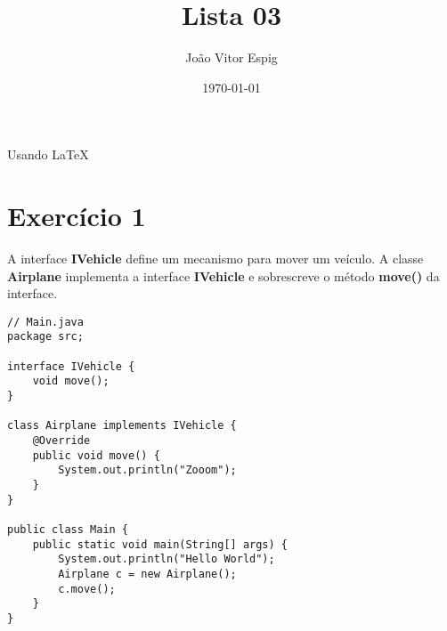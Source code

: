 \documentclass[12pt,a4paper,brazil]{article}
\title{Lista 03}
\author{João Vitor Espig}
\date{\today}
\begin{document}
\maketitle
Usando \LaTeX

\section*{Exercício 1}
A interface \textbf{IVehicle} define um mecanismo para mover um veículo. A classe \textbf{Airplane} implementa a interface \textbf{IVehicle} e sobrescreve o método \textbf{move()} da interface.
\begin{lstlisting}
// Main.java
package src;

interface IVehicle {
    void move();
}

class Airplane implements IVehicle {
    @Override
    public void move() {
        System.out.println("Zooom");
    }
}

public class Main {
    public static void main(String[] args) {
        System.out.println("Hello World");
        Airplane c = new Airplane();
        c.move();
    }
}
\end{lstlisting}
\end{document}
